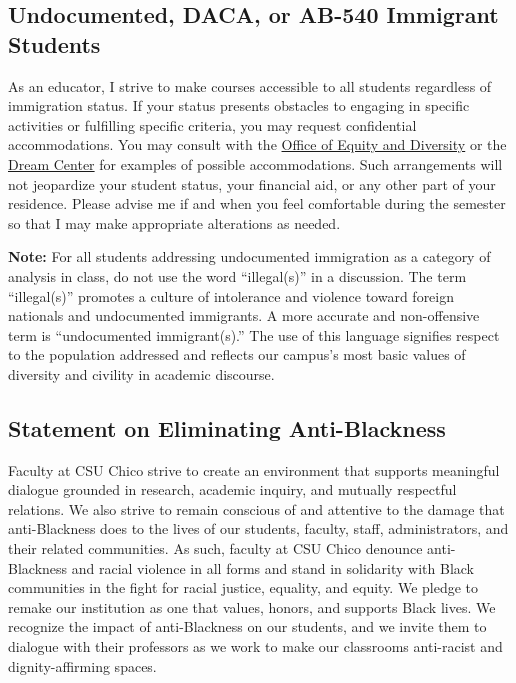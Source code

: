 \documentclass[11pt,]{article}
\begin{document}
\hypertarget{undocumented-daca-or-ab-540-immigrant-students}{%
\subsection{Undocumented, DACA, or AB-540 Immigrant
Students}\label{undocumented-daca-or-ab-540-immigrant-students}}

As an educator, I strive to make courses accessible to all students
regardless of immigration status. If your status presents obstacles to
engaging in specific activities or fulfilling specific criteria, you may
request confidential accommodations. You may consult with the
\href{https://www.csuchico.edu/diversity/}{Office of Equity and
Diversity} or the \href{https://www.csuchico.edu/dreamcenter/}{Dream
Center} for examples of possible accommodations. Such arrangements will
not jeopardize your student status, your financial aid, or any other
part of your residence. Please advise me if and when you feel
comfortable during the semester so that I may make appropriate
alterations as needed.

\textbf{Note:} For all students addressing undocumented immigration as a
category of analysis in class, do not use the word ``illegal(s)'' in a
discussion. The term ``illegal(s)'' promotes a culture of intolerance
and violence toward foreign nationals and undocumented immigrants. A
more accurate and non-offensive term is ``undocumented immigrant(s).''
The use of this language signifies respect to the population addressed
and reflects our campus's most basic values of diversity and civility in
academic discourse.

\hypertarget{statement-on-eliminating-anti-blackness}{%
\subsection{Statement on Eliminating
Anti-Blackness}\label{statement-on-eliminating-anti-blackness}}

Faculty at CSU Chico strive to create an environment that supports
meaningful dialogue grounded in research, academic inquiry, and mutually
respectful relations. We also strive to remain conscious of and
attentive to the damage that anti-Blackness does to the lives of our
students, faculty, staff, administrators, and their related communities.
As such, faculty at CSU Chico denounce anti-Blackness and racial
violence in all forms and stand in solidarity with Black communities in
the fight for racial justice, equality, and equity. We pledge to remake
our institution as one that values, honors, and supports Black lives. We
recognize the impact of anti-Blackness on our students, and we invite
them to dialogue with their professors as we work to make our classrooms
anti-racist and dignity-affirming spaces.
\end{document}
